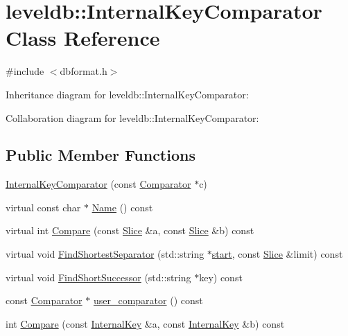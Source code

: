 \hypertarget{classleveldb_1_1_internal_key_comparator}{}\section{leveldb\+:\+:Internal\+Key\+Comparator Class Reference}
\label{classleveldb_1_1_internal_key_comparator}


{\ttfamily \#include $<$dbformat.\+h$>$}



Inheritance diagram for leveldb\+:\+:Internal\+Key\+Comparator\+:


Collaboration diagram for leveldb\+:\+:Internal\+Key\+Comparator\+:
\subsection*{Public Member Functions}
\begin{DoxyCompactItemize}
\item 
\hyperlink{classleveldb_1_1_internal_key_comparator_a0069a8b4828f592da66937e2c3471080}{Internal\+Key\+Comparator} (const \hyperlink{structleveldb_1_1_comparator}{Comparator} $\ast$c)
\item 
virtual const char $\ast$ \hyperlink{classleveldb_1_1_internal_key_comparator_a762ec9028955d3a5fc61fb5c718ff4f1}{Name} () const 
\item 
virtual int \hyperlink{classleveldb_1_1_internal_key_comparator_a6469a0d67a9025173d31ec6e1cd5f80e}{Compare} (const \hyperlink{classleveldb_1_1_slice}{Slice} \&a, const \hyperlink{classleveldb_1_1_slice}{Slice} \&b) const 
\item 
virtual void \hyperlink{classleveldb_1_1_internal_key_comparator_afe98c9042e34927e60e078fc103991bf}{Find\+Shortest\+Separator} (std\+::string $\ast$\hyperlink{db__bench_8cc_ab376b87f96a574a793c03c53e75afec8}{start}, const \hyperlink{classleveldb_1_1_slice}{Slice} \&limit) const 
\item 
virtual void \hyperlink{classleveldb_1_1_internal_key_comparator_a5dc88f433ef3a0d9508ec17cb40d3e27}{Find\+Short\+Successor} (std\+::string $\ast$key) const 
\item 
const \hyperlink{structleveldb_1_1_comparator}{Comparator} $\ast$ \hyperlink{classleveldb_1_1_internal_key_comparator_a86ca575a4560bb76e2bcebc0618abd31}{user\+\_\+comparator} () const 
\item 
int \hyperlink{classleveldb_1_1_internal_key_comparator_a4ff5764f03e6d8244c8798e0588552a7}{Compare} (const \hyperlink{classleveldb_1_1_internal_key}{Internal\+Key} \&a, const \hyperlink{classleveldb_1_1_internal_key}{Internal\+Key} \&b) const 
\end{DoxyCompactItemize}


